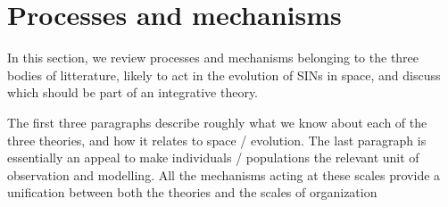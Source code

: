 \documentclass[11pt,oneside]{article}
\begin{document}
%

\section{Processes and mechanisms}

In this section, we review processes and mechanisms belonging to the three
bodies of litterature, likely to act in the evolution of SINs in space, and
discuss which should be part of an integrative theory.

The first three paragraphs describe roughly what we know about each of the three
theories, and how it relates to space / evolution. The last paragraph is
essentially an appeal to make individuals / populations the relevant unit of
observation and modelling. All the mechanisms acting at these scales provide a
unification between both the theories and the scales of organization
\end{document}
